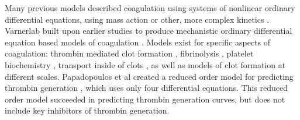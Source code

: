 \documentclass[11pt]{article}
\begin{document}
Many previous models described coagulation using systems of nonlinear ordinary differential equations, using mass action or other, more complex kinetics \citep{Khanin:1989aa,Willems:1991aa,Baldwin:1994aa,Leipold:1995aa,Kuharsky:2001aa}. Varnerlab built upon earlier studies \citep{Jones:1994aa,Hockin:2002aa,Butenas:2004aa} to produce mechanistic ordinary differential equation based models of coagulation \citep{Luan:2007aa,Luan:2010aa}. Models exist for specific aspects of coagulation: thrombin mediated clot formation \citep{Chatterjee:2010aa}, fibrinolysis \citep{Mitrophanov:2014aa}, platelet biochemistry \citep{Stalker:2013aa}, transport inside of clots \citep{Voronov:2013aa}, as well as models of clot formation at different scales\citep{Leiderman:2014aa, Bannish:2014ab}. Papadopoulos et al created a reduced order model for predicting thrombin generation \citep{Atkin:2014}, which uses only four differential equations. This reduced order model succeeded in predicting thrombin generation curves, but does not include key inhibitors of thrombin generation.  
\end{document}
